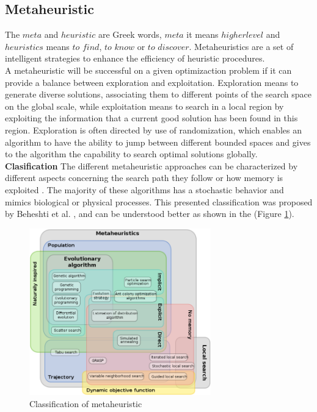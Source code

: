 \subsection{Metaheuristic}
The $meta$ and $heuristic$ are Greek words, $meta$ it means $higher level$ and $heuristics$ means $to$ $find$, $to$ $know$ or $to$ $discover$. Metaheuristics are a set of intelligent strategies to enhance the efficiency of heuristic procedures.\\
A metaheuristic will be successful on a given optimizaction problem if it can provide a balance between exploration and exploitation. Exploration means to generate diverse solutions, associating them to different points of the search space on the global scale, while exploitation means to search in a local region by exploiting the information that a current good solution has been found in this region.
Exploration is often directed by use of randomization, which enables an algorithm to have the ability to jump between different bounded spaces and gives to the algorithm the capability to search optimal solutions globally.\\

\textbf{Clasification}
The different metaheuristic approaches can be characterized by different aspects concerning the search path they follow or how memory is exploited \cite{citeulike:1859945}. The majority of these algorithms has a stochastic behavior and mimics biological or  physical processes. This presented classification was proposed by Beheshti et al. \cite{Beheshti:2014:CCA:2563733.2564085}, and can be understood better as shown in the (Figure \ref{fig:classification-of-mh}).

\squeezeup
\begin{figure}[ht] %
	\centering
  \includegraphics[width=0.70\textwidth]{MarcoTeorico/imagenes/classification_mh.png}
	\caption{Classification of metaheuristic}\label{fig:classification-of-mh}
\end{figure}
\squeezeup


